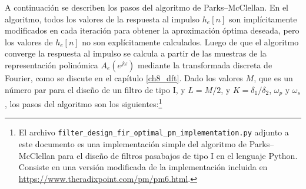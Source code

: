 \documentclass[a4paper]{report}
\begin{document}
A continuación se describen los pasos del algoritmo de Parks--McClellan. En el algoritmo, todos los valores de la respuesta al impulso \(h_e[n]\) son implícitamente modificados en cada iteración para obtener la aproximación óptima deseada, pero los valores de \(h_e[n]\) no son explícitamente calculados. Luego de que el algoritmo converge la respuesta al impulso se calcula a partir de las muestras de la representación polinómica \(A_e(e^{j\omega})\) mediante la transformada discreta de Fourier, como se discute en el capítulo \ref{ch8_dft}. Dado los valores \(M\), que es un número par para el diseño de un filtro de tipo I, y \(L=M/2\), y \(K=\delta_1/\delta_2\), \(\omega_p\) y \(\omega_s\), los pasos del algoritmo son los siguientes:\footnote{El archivo \texttt{filter\_design\_fir\_optimal\_pm\_implementation.py} adjunto a este documento es una implementación simple del algoritmo de Parks--McClellan para el diseño de filtros pasabajos de tipo I en el lenguaje Python. Consiste en una versión modificada de la implementación incluida en \url{https://www.theradixpoint.com/pm/pm6.html}.}
\end{document}
